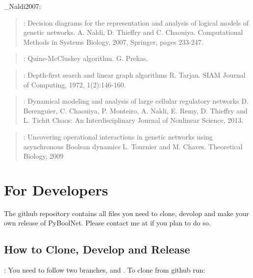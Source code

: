 \documentclass[letterpaper,10pt,english]{sphinxmanual}
\begin{document}
\textendash{} \_Naldi2007:
\begin{quote}

:
Decision diagrams for the representation and analysis of logical models of genetic networks.
A. Naldi, D. Thieffry and C. Chaouiya.
Computational Methods in Systems Biology, 2007, Springer, pages 233-247.
\end{quote}
\label{\detokenize{Bibliography:prekas2012}}\begin{quote}

:
Quine-McCluskey algorithm.
G. Prekas.
\end{quote}
\label{\detokenize{Bibliography:tarjan1972}}\begin{quote}

:
Depth-first search and linear graph algorithms
R. Tarjan.
SIAM Journal of Computing, 1972, 1(2):146-160.
\end{quote}
\label{\detokenize{Bibliography:berenguier2013}}\begin{quote}

:
Dynamical modeling and analysis of large cellular regulatory networks
D. Berenguier, C. Chaouiya, P. Monteiro, A. Naldi, E. Remy, D. Thieffry and L. Tichit
Chaos: An Interdisciplinary Journal of Nonlinear Science, 2013.
\end{quote}
\label{\detokenize{Bibliography:tournier2009}}\begin{quote}

:
Uncovering operational interactions in genetic networks using asynchronous Boolean dynamics
L. Tournier and M. Chaves.
Theoretical Biology, 2009
\end{quote}


\chapter{For Developers}
\label{\detokenize{Development:networkx-has-path}}\label{\detokenize{Development::doc}}\label{\detokenize{Development:for-developers}}
The github repository contains all files you need to clone, devolop and make your own release of PyBoolNet.
Please contact me at  if you plan to do so.


\section{How to Clone, Develop and Release}
\label{\detokenize{Development:how-to-clone-develop-and-release}}
:
You need to follow two branches,  and .
To clone from github run:
\end{document}

